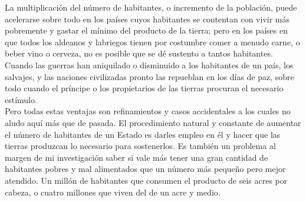 \documentclass[10pt]{article}
\begin{document}
\begin{multicols}{1}
La multiplicación del número de habitantes, o incremento de la población, puede acelerarse sobre todo en los países cuyos habitantes se contentan con vivir más pobremente y gastar el mínimo del producto de la tierra; pero en los países en que todos los aldeanos y labriegos tienen por costumbre comer a menudo carne, o beber vino o cerveza, no es posible que se dé sustento a tantos habitantes.\\
Cuando las guerras han aniquilado o disminuido a los habitantes de un país, los salvajes, y las naciones civilizadas pronto las repueblan en los días de paz, sobre todo cuando el príncipe o los propietarios de las tierras procuran el necesario estímulo.\\
Pero todas estas ventajas son refinamientos y casos accidentales a los cuales no aludo aquí más que de pasada. El procedimiento natural y constante de aumentar el número de habitantes de un Estado es darles empleo en él y hacer que las tierras produzcan lo necesario para sostenerlos. Es también un problema al margen de mi investigación saber si vale más tener una gran cantidad de habitantes pobres y mal alimentados que un número más pequeño pero mejor atendido. Un millón de habitantes que consumen el producto de seis acres por cabeza, o cuatro millones que viven del de un acre y medio.

\end{multicols}
\end{document}
